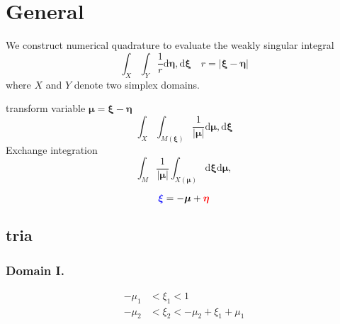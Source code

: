 \documentclass{article}
\newcommand{\td}{\mathrm{d}}
\newcommand{\td}{\mathrm{d}}
\begin{document}
\section{General}

We construct numerical quadrature to evaluate the weakly singular integral
%
\begin{equation}
\int_X
\int_Y
\frac{1}{r}
\td \bm{\eta},
\td \bm{\xi}
\quad
r = |\bm{\xi}-\bm{\eta}|
\end{equation}
%
where $X$ and $Y$ denote two simplex domains.


transform variable $\bm{\mu} = \bm{\xi}-\bm{\eta}$
%
\begin{equation}
\int_X
\int_{M(\bm{\xi})}
\frac{1}{|\bm{\mu}|}
\td \bm{\mu},
\td \bm{\xi}
\end{equation}
%
Exchange integration
%
\begin{equation}
\int_{M}
\frac{1}{|\bm{\mu}|}
\int_{X(\bm{\mu})}
\td \bm{\xi}
\td \bm{\mu},
\end{equation}



\begin{equation}
{\color{blue}\bm{\xi}} = -\bm{\mu} + {\color{red}\bm{\eta}}
\end{equation}



\subsection{tria}

\newcommand{\commontri}{
\path [draw=gray] (1,0) -- (1,1) -- (0,1) -- (-1,0) -- (-1,-1) -- (0,-1) -- cycle;
\path [draw=gray] (-1,0) -- (1,0);
\path [draw=gray] (0,-1) -- (0,1);
\path [draw=gray] (-1,-1) -- (1,1);
\path [draw, ->] (-.2,0) -- (1.2,0) node [anchor = west] {$\xi_1$};
\path [draw, ->] (0,-.2) -- (0,1.2) node [anchor = south] {$\xi_2$};
\path [fill=red, opacity=.5] (0-\m,0-\p) -- (1-\m,0-\p) -- (1-\m,1-\p) -- cycle;
\path [fill = blue, opacity=.5] (0,0) -- (1,0) -- (1,1) -- cycle;
\path [draw, fill] (\m,\p) circle(.03) -- (-\m,-\p) circle(.03);
}


\subsubsection{Domain I.}
%
%
\begin{align}
-\mu_1 &< \xi_1 < 1 \nonumber \\
-\mu_2 &< \xi_2 < -\mu_2 + \xi_1+\mu_1 \nonumber
\end{align}
\end{document}
